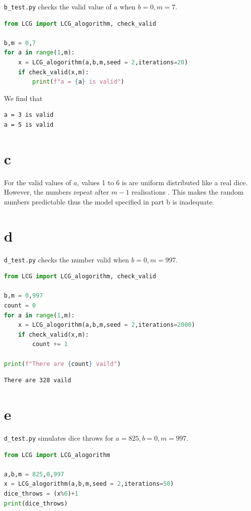 \documentclass[12pt,a4paper]{article}
\begin{document}
\texttt{b\_test.py} checks the valid value of $a$ when $b=0, m=7$.

\begin{lstlisting}[language=Python, caption=\texttt{b\_test.py}]
from LCG import LCG_alogorithm, check_valid

b,m = 0,7
for a in range(1,m):
    x = LCG_alogorithm(a,b,m,seed = 2,iterations=20)
    if check_valid(x,m):
        print(f"a = {a} is valid")
\end{lstlisting}
We find that

\begin{verbatim}
a = 3 is valid
a = 5 is valid
\end{verbatim}

\section*{c}
For the valid values of $a$, values 1 to 6 is are uniform distributed like a real dice. However, the numbers repeat after $m-1$ realisations . This makes the random numbers predictable thus the model specified in part b is inadequate. 

\section*{d}

\texttt{d\_test.py} checks the number valid when $b=0, m=997$.

\begin{lstlisting}[language=Python, caption=\texttt{d\_test.py}]
from LCG import LCG_alogorithm, check_valid

b,m = 0,997
count = 0
for a in range(1,m):
    x = LCG_alogorithm(a,b,m,seed = 2,iterations=2000)
    if check_valid(x,m):
        count += 1

print(f"There are {count} vaild")
\end{lstlisting}
\begin{verbatim}
There are 328 vaild
\end{verbatim}

\section*{e}
\texttt{d\_test.py} simulates dice throws for $a = 825, b=0, m=997$.

\begin{lstlisting}[language=Python, caption=\texttt{e\_test.py}]
from LCG import LCG_alogorithm

a,b,m = 825,0,997
x = LCG_alogorithm(a,b,m,seed = 2,iterations=50)
dice_throws = (x%6)+1
print(dice_throws)
\end{lstlisting}
\end{document}
